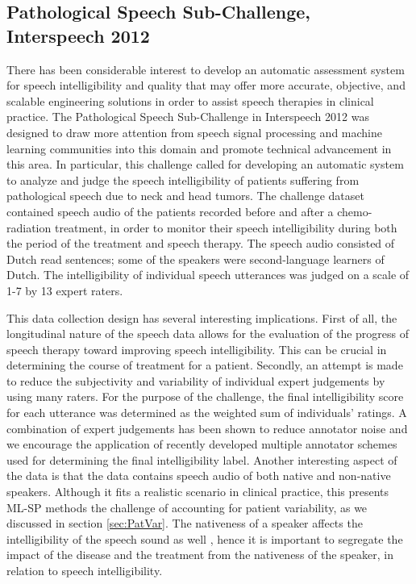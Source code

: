 \documentclass{article}
\begin{document}
\subsection{Pathological Speech Sub-Challenge, Interspeech 2012}
There has been considerable interest to develop an automatic assessment system for speech intelligibility and quality that may offer more accurate, objective, and scalable engineering solutions in order to assist speech therapies in clinical practice. The Pathological Speech Sub-Challenge in Interspeech 2012 was designed to draw more attention from speech signal processing and machine learning communities into this domain and promote technical advancement in this area.
In particular, this challenge called for developing an automatic system to analyze and judge the speech intelligibility of patients suffering from pathological speech due to neck and head tumors. The challenge dataset contained speech audio of the patients recorded before and after a chemo-radiation treatment, in order to monitor their speech intelligibility during both the period of the treatment and speech therapy.
The speech audio consisted of Dutch read sentences; some of the speakers were second-language learners of Dutch. The intelligibility of individual speech utterances was judged on a scale of 1-7 by 13 expert raters.

This data collection design has several interesting implications. First of all, the longitudinal nature of the speech data allows for the evaluation of the progress of speech therapy toward improving speech intelligibility.
This can be crucial in determining the course of treatment for a patient. Secondly, an attempt is made to reduce the subjectivity and variability of individual expert judgements by using many raters. For the purpose of the challenge, the final intelligibility score for each utterance was determined as the weighted sum of individuals' ratings. A combination of expert judgements has been shown to reduce annotator noise \cite{kuncheva2004combining} and we encourage the application of recently developed multiple annotator schemes \cite{audhkhasi2013globally} used for determining the final intelligibility label. 
Another interesting aspect of the data is that the data contains speech audio of both native and non-native speakers. Although it fits a realistic scenario in clinical practice, this presents ML-SP methods the challenge of accounting for patient variability, as we discussed in section \ref{sec:PatVar}. The nativeness of a speaker affects the intelligibility of the speech sound as well \cite{van2001intelligibility}, hence it is important to segregate the impact of the disease and the treatment from the nativeness of the speaker, in relation to speech intelligibility.
\end{document}
